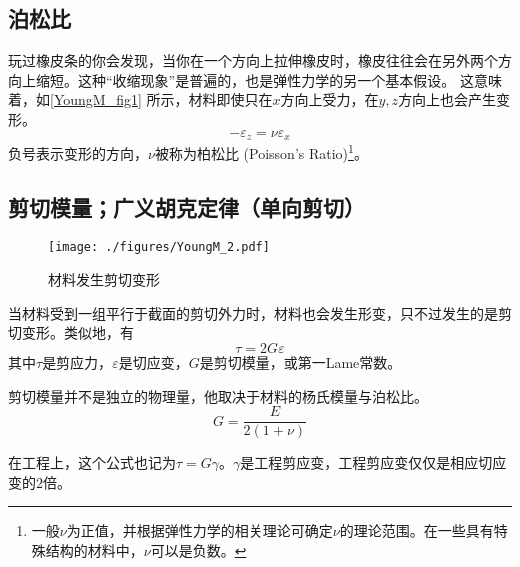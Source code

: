 \subsection{泊松比}
玩过橡皮条的你会发现，当你在一个方向上拉伸橡皮时，橡皮往往会在另外两个方向上缩短。这种“收缩现象”是普遍的，也是弹性力学的另一个基本假设。%
这意味着，如\autoref{YoungM_fig1} 所示，材料即使只在$x$方向上受力，在$y,z$方向上也会产生变形。
\begin{equation}
-\varepsilon_z= \nu \varepsilon_x
\end{equation}
负号表示变形的方向，$\nu$被称为柏松比 (Poisson's Ratio)\footnote{一般$\nu$为正值，并根据弹性力学的相关理论可确定$\nu$的理论范围。在一些具有特殊结构的材料中，$\nu$可以是负数。}。%

\subsection{剪切模量；广义胡克定律（单向剪切）}
\begin{figure}[ht]
\centering
\texttt{[image: ./figures/YoungM\_2.pdf]}
\caption{材料发生剪切变形} \label{YoungM_fig2}
\end{figure}
当材料受到一组平行于截面的剪切外力时，材料也会发生形变，只不过发生的是剪切变形。类似地，有
\begin{equation}
\tau=2G\varepsilon
\end{equation}
其中$\tau$是剪应力，$\varepsilon$是切应变，$G$是剪切模量，或第一Lame常数。

剪切模量并不是独立的物理量，他取决于材料的杨氏模量与泊松比。
\begin{equation}
G = \frac{E}{2(1+\nu)}
\end{equation}

在工程上，这个公式也记为$\tau=G\gamma$。$\gamma$是工程剪应变，工程剪应变仅仅是相应切应变的$2$倍。
